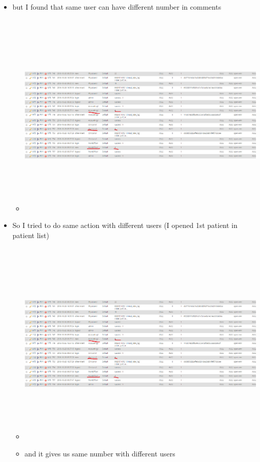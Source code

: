 \documentclass[paper=a4, fontsize=11pt]{scrartcl} %
\numberwithin{equation}{section} %
\numberwithin{figure}{section} %
\numberwithin{table}{section} %
\begin{document}
\begin{itemize}
\begin{itemize}
		\end{itemize}
	\item but I found that same user can have different number in comments
	\begin{itemize}
		\item
		 \includegraphics[width = 20cm, height=10cm]{pictures/samenumberinsameaction.png}
		\end{itemize}
	\item So I tried to do same action with different users (I opened 1st patient in patient list)
	\begin{itemize}
		\item
		 \includegraphics[width = 20cm, height=10cm]{pictures/samenumberinsameaction.png}
		\item and it gives us same number with different users

\end{itemize}
\end{itemize}
\end{document}
